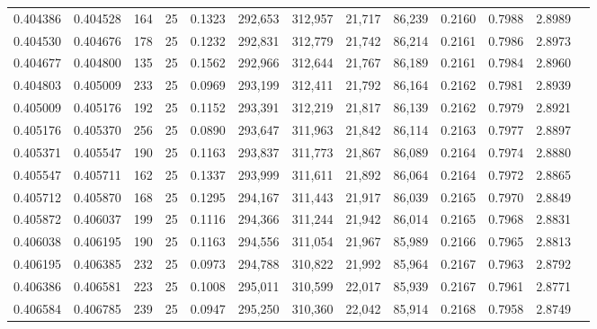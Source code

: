 \begin{tabular}{rrrrrrrrrrrrr}
0.404386 & 0.404528 &   164 &  25 &                                     0.1323 & 292,653 & 312,957 &  21,717 &  86,239 & 0.2160 & 0.7988 & 2.8989 \\
0.404530 & 0.404676 &   178 &  25 &                                     0.1232 & 292,831 & 312,779 &  21,742 &  86,214 & 0.2161 & 0.7986 & 2.8973 \\
0.404677 & 0.404800 &   135 &  25 &                                     0.1562 & 292,966 & 312,644 &  21,767 &  86,189 & 0.2161 & 0.7984 & 2.8960 \\
0.404803 & 0.405009 &   233 &  25 &                                     0.0969 & 293,199 & 312,411 &  21,792 &  86,164 & 0.2162 & 0.7981 & 2.8939 \\
0.405009 & 0.405176 &   192 &  25 &                                     0.1152 & 293,391 & 312,219 &  21,817 &  86,139 & 0.2162 & 0.7979 & 2.8921 \\
0.405176 & 0.405370 &   256 &  25 &                                     0.0890 & 293,647 & 311,963 &  21,842 &  86,114 & 0.2163 & 0.7977 & 2.8897 \\
0.405371 & 0.405547 &   190 &  25 &                                     0.1163 & 293,837 & 311,773 &  21,867 &  86,089 & 0.2164 & 0.7974 & 2.8880 \\
0.405547 & 0.405711 &   162 &  25 &                                     0.1337 & 293,999 & 311,611 &  21,892 &  86,064 & 0.2164 & 0.7972 & 2.8865 \\
0.405712 & 0.405870 &   168 &  25 &                                     0.1295 & 294,167 & 311,443 &  21,917 &  86,039 & 0.2165 & 0.7970 & 2.8849 \\
0.405872 & 0.406037 &   199 &  25 &                                     0.1116 & 294,366 & 311,244 &  21,942 &  86,014 & 0.2165 & 0.7968 & 2.8831 \\
0.406038 & 0.406195 &   190 &  25 &                                     0.1163 & 294,556 & 311,054 &  21,967 &  85,989 & 0.2166 & 0.7965 & 2.8813 \\
0.406195 & 0.406385 &   232 &  25 &                                     0.0973 & 294,788 & 310,822 &  21,992 &  85,964 & 0.2167 & 0.7963 & 2.8792 \\
0.406386 & 0.406581 &   223 &  25 &                                     0.1008 & 295,011 & 310,599 &  22,017 &  85,939 & 0.2167 & 0.7961 & 2.8771 \\
0.406584 & 0.406785 &   239 &  25 &                                     0.0947 & 295,250 & 310,360 &  22,042 &  85,914 & 0.2168 & 0.7958 & 2.8749 \\

\end{tabular}
